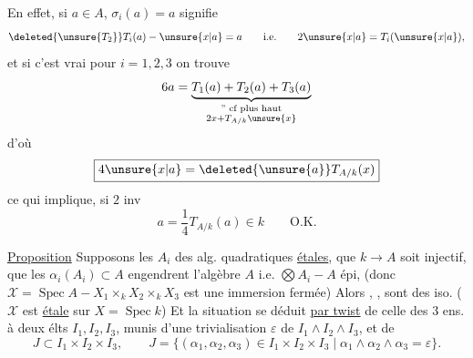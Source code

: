 En effet, si $a\in A$, $\sigma_i(a)=a$ signifie
\[
 \deleted{\unsure{T_2}}T_i(a)-\unsure{x|a}=a\qquad\text{i.e.}\qquad2\unsure{x|a}=T_i(\unsure{x|a}),
\]
et si c'est vrai pour $i=1,2,3$ on trouve
\[
 6a=\underbrace{T_1(a)+T_2(a)+T_3(a)}_{\substack{\text{'' cf plus haut}\\2x+T_{A/k}\unsure{x}}}
\]
d'où
\[
 \boxed{4\unsure{x|a}=\deleted{\unsure{a}}T_{A/k}(x)}
\]
ce qui implique, si $2$ inv
\[
 a=\frac14T_{A/k}(a)\in k\qquad\text{O.K.}
\]

\uline{Proposition} Supposons les $A_i$ des alg. quadratiques \uline{étales}, que $k\longrightarrow A$ soit injectif, que les $\alpha_i(A_i)\subset A$ engendrent l'algèbre $A$ i.e. $\bigotimes A_i\mathbin{-}A$ épi,
(donc $\mathcal X=\operatorname{Spec}A\mathbin{-}X_1\times_k X_2\times_k X_3$ est une immersion fermée) 
Alors 
,
,
sont des iso. ( $\mathcal X$ est  \uline{étale} sur $X=\operatorname{Spec}k$)
Et la situation se déduit \uline{par twist} de celle des 3 ens. à deux élts  $I_1,I_2,I_3$, munis d'une trivialisation $\varepsilon$ de $I_1\wedge I_2\wedge I_3$, et de
\[
 J\subset I_1\times I_2\times I_3,\qquad J=\{(\alpha_1,\alpha_2,\alpha_3)\in I_1\times I_2\times I_3\mid\alpha_1\wedge\alpha_2\wedge\alpha_3=\varepsilon\}.
\]

